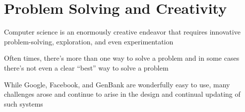 \documentclass[8pt,a4paper,compress]{beamer}
\begin{document}
\section{Problem Solving and Creativity}
\begin{frame}[fragile]
Computer science is an enormously creative endeavor that requires innovative problem-solving, exploration, and even experimentation

\bigskip

Often times, there's more than one way to solve a problem and in some cases there's not even a clear ``best'' way to solve a problem

\bigskip

While Google, Facebook, and GenBank are wonderfully easy to use, many challenges arose and continue to arise in the design and continual updating of such systems
\end{frame}
\end{document}
